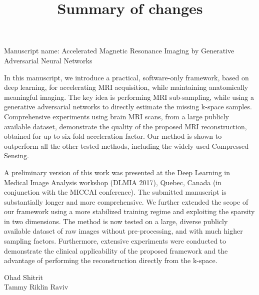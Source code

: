 \documentclass[12pt]{article}
\begin{document}
\thispagestyle{empty}

\title{Summary of changes}
\maketitle
Manuscript name: Accelerated Magnetic Resonance Imaging by Generative Adversarial Neural Networks
\vspace{0.2cm}


\vspace{0.2cm}

In this manuscript, we introduce a practical, software-only framework, based on deep learning, for accelerating MRI acquisition, while maintaining anatomically meaningful imaging. The key idea is performing MRI sub-sampling, while using a generative adversarial networks to directly estimate the missing k-space samples.
Comprehensive experiments using brain MRI scans, from a large publicly available dataset, demonstrate the quality of the proposed MRI reconstruction, obtained for up to six-fold acceleration factor. 
Our method is shown to outperform all the other tested methods, including the widely-used Compressed Sensing.


A preliminary version of this work was presented at the Deep Learning in Medical Image Analysis workshop (DLMIA 2017), Quebec, Canada
(in conjunction with the MICCAI conference). The submitted manuscript is substantially
longer and more comprehensive. We further extended the scope of our framework using a more stabilized training regime and exploiting the sparsity in two dimensions. The method is now tested on a large, diverse publicly available dataset of raw images without pre-processing, and with much higher sampling factors. Furthermore, extensive experiments were conducted to demonstrate the clinical applicability of the proposed framework and the advantage of performing the reconstruction directly from the k-space.


\vspace{0.2cm}

Ohad Shitrit\\
Tammy Riklin Raviv
\end{document}
